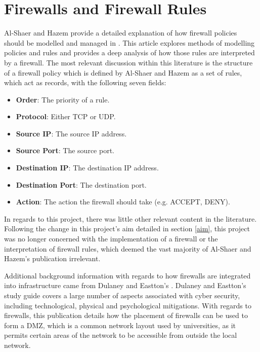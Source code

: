 \documentclass[a4paper, 11pt]{report}
\begin{document}
\section{Firewalls and Firewall Rules}
Al-Shaer and Hazem provide a detailed explanation of how firewall policies should be modelled and managed in  \cite{firewall}. This article explores methods of modelling policies and rules and provides a deep analysis of how those rules are interpreted by a firewall. The most relevant discussion within this literature is the structure of a firewall policy which is defined by Al-Shaer and Hazem as a set of rules, which act as records, with the following seven fields:

\begin{itemize}
    \item \textbf{Order}: The priority of a rule.
    \item \textbf{Protocol}: Either \acrfull{TCP} or \acrfull{UDP}.
    \item \textbf{Source IP}: The source IP address.
    \item \textbf{Source Port}: The source port.
    \item \textbf{Destination IP}: The destination IP address.
    \item \textbf{Destination Port}: The destination port.
    \item \textbf{Action}: The action the firewall should take (e.g. ACCEPT, DENY).
\end{itemize}

In regards to this project, there was little other relevant content in the literature. Following the change in this project's aim detailed in section \ref{aim}, this project was no longer concerned with the implementation of a firewall or the interpretation of firewall rules, which deemed the vast majority of Al-Shaer and Hazem's publication irrelevant.

Additional background information with regards to how firewalls are integrated into infrastructure came from Dulaney and Eastton's  \cite{comptiaSec}. Dulaney and Eastton's study guide covers a large number of aspects associated with cyber security, including technological, physical and psychological mitigations. With regards to firewalls, this publication details how the placement of firewalls can be used to form a \acrfull{DMZ}, which is a common network layout used by universities, as it permits certain areas of the network to be accessible from outside the local network.
\end{document}
